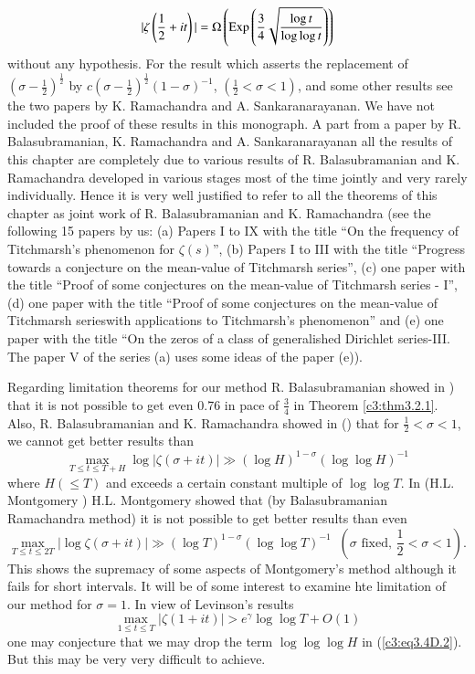 $$
|\zeta \left(\frac{1}{2} + it \right)| = \Omega \left(\operatorname{Exp} \left(\frac{3}{4} \sqrt{\frac{\log t}{\log \log t}} \right) \right)
$$
without any hypothesis. For the result which asserts the replacement of $(\sigma -\frac{1}{2})^{\frac{1}{2}}$ by $c(\sigma -\frac{1}{2})^{\frac{1}{2}} (1-\sigma)^{-1}$, $(\frac{1}{2} < \sigma <1)$, and some other results see the two papers \cite{Ramachandra and Sankaranarayanan1} \cite{Ramachandra and Sankaranarayanan2} by K. Ramachandra and A. Sankaranarayanan. We have not included the proof of these results in this monograph. A part from a paper \cite{Balasubramanian Ramachandra and Sankaranarayanan1} by R. Balasubramanian, K. Ramachandra and A. Sankaranarayanan all the results of this chapter are completely due to various results of R. Balasubramanian and K. Ramachandra developed in various stages most of the time jointly and very rarely individually. Hence it is  very well justified to refer to all the theorems of this chapter as joint work of R. Balasubramanian and K. Ramachandra (see the following 15 papers by us: (a) Papers I to IX with the title ``On the frequency of Titchmarsh's phenomenon for $\zeta(s)$'', (b) Papers I to III with the title ``Progress towards a conjecture on the mean-value of Titchmarsh series'', (c) one paper with the title ``Proof of some conjectures on the mean-value of Titchmarsh series - I'', (d) one paper with the title ``Proof of some conjectures on the mean-value of Titchmarsh series\pageoriginale with applications to Titchmarsh's phenomenon'' and (e) one paper with the title ``On the zeros of a class of generalished Dirichlet series-III. The paper V of the series (a) uses some ideas of the paper (e)).

Regarding limitation theorems for our method R. Balasubramanian showed in \cite{Balasubramanian1}) that it is not possible to get even 0.76 in pace of $\frac{3}{4}$ in Theorem \ref{c3:thm3.2.1}. Also, R. Balasubramanian and K. Ramachandra showed in (\cite{Balasubramanian and Ramachandra6}) that for $\frac{1}{2} <\sigma < 1$, we cannot get better results than
$$
\max\limits_{T \leq t \leq T + H} \log |\zeta( \sigma + it)| \gg (\log H)^{1-\sigma} (\log \log H)^{-1}
$$
where $H(\leq T)$ and exceeds a certain constant multiple of $\log \log T$. In (H.L. Montgomery \cite{Montgomery3}) H.L. Montgomery showed that (by Balasubramanian Ramachandra method) it is not possible to get better results than even
$$ 
\max\limits_{T \leq t \leq 2 T} |\log \zeta(\sigma + it)| \gg (\log T)^{1-\sigma} (\log \log T)^{-1} \;\; \left(\sigma \text{ fixed, } \frac{1}{2} < \sigma < 1 \right).
$$
This shows the supremacy of some aspects of Montgomery's method although it fails for short intervals. It will be of some interest to examine hte limitation of our method for $\sigma =1$. In view of Levinson's results
$$
\max\limits_{1 \leq t \leq T} |\zeta(1+ it )| > e^\gamma  \log \log T + O(1)
$$
one may conjecture that we may drop the term $\log \log \log H$ in (\ref{c3:eq3.4D.2}). But this may be very very difficult to achieve. 
